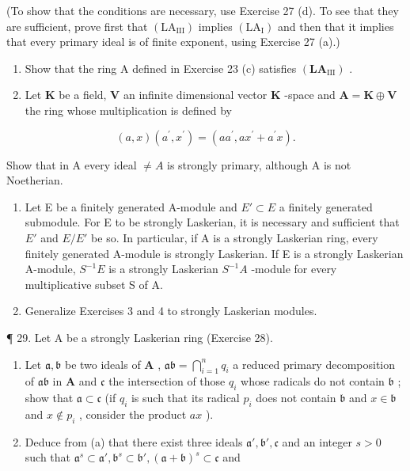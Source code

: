 (To show that the conditions are necessary, use Exercise 27 (d). To see that they are sufficient, prove first that \((\mathrm{LA}_{\mathrm{III}})\) implies \((\mathrm{LA}_{\mathrm{I}})\) and then that it implies that every primary ideal is of finite exponent, using Exercise 27 (a).)

\begin{enumerate}
\def\labelenumi{(\alph{enumi})}
\setcounter{enumi}{1}
\item
  Show that the ring A defined in Exercise 23 (c) satisfies \((\mathbf{LA}_{\mathrm{III}})\) .
\item
  Let \(\mathbf{K}\) be a field, \(\mathbf{V}\) an infinite dimensional vector \(\mathbf{K}\) -space and \(\mathbf{A} = \mathbf{K} \oplus \mathbf{V}\) the ring whose multiplication is defined by
\end{enumerate}

\[
(a, x) (a ^ {\prime}, x ^ {\prime}) = (a a ^ {\prime}, a x ^ {\prime} + a ^ {\prime} x).
\]

Show that in A every ideal \(\neq A\) is strongly primary, although A is not Noetherian.

\begin{enumerate}
\def\labelenumi{(\alph{enumi})}
\setcounter{enumi}{3}
\item
  Let E be a finitely generated A-module and \(E' \subset E\) a finitely generated submodule. For E to be strongly Laskerian, it is necessary and sufficient that \(E'\) and \(E/E'\) be so. In particular, if A is a strongly Laskerian ring, every finitely generated A-module is strongly Laskerian. If E is a strongly Laskerian A-module, \(S^{-1}E\) is a strongly Laskerian \(S^{-1}A\) -module for every multiplicative subset S of A.
\item
  Generalize Exercises 3 and 4 to strongly Laskerian modules.
\end{enumerate}

¶ 29. Let A be a strongly Laskerian ring (Exercise 28).

\begin{enumerate}
\def\labelenumi{(\alph{enumi})}
\item
  Let \(\mathfrak{a}, \mathfrak{b}\) be two ideals of \(\mathbf{A}\) , \(\mathfrak{ab} = \bigcap_{i=1}^{n} q_i\) a reduced primary decomposition of \(\mathfrak{ab}\) in \(\mathbf{A}\) and \(\mathfrak{c}\) the intersection of those \(q_i\) whose radicals do not contain \(\mathfrak{b}\) ; show that \(\mathfrak{a} \subset \mathfrak{c}\) (if \(q_i\) is such that its radical \(p_i\) does not contain \(\mathfrak{b}\) and \(x \in \mathfrak{b}\) and \(x \notin p_i\) , consider the product \(ax\) ).
\item
  Deduce from (a) that there exist three ideals \(\mathfrak{a}', \mathfrak{b}', \mathfrak{c}\) and an integer \(s > 0\) such that \(\mathfrak{a}^s \subset \mathfrak{a}', \mathfrak{b}^s \subset \mathfrak{b}', (\mathfrak{a} + \mathfrak{b})^s \subset \mathfrak{c}\) and
\end{enumerate}

